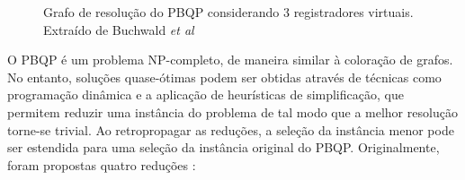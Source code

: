 \documentclass[
	12pt,				%
	openright,			%
	oneside,			%
	a4paper,			%
	tccpreliminar,			%
	]{ABNT-DC-UEL}
\begin{document}
\begin{figure}
    \centering
    
    \caption{Grafo de resolução do PBQP considerando 3 registradores virtuais. Extraído de Buchwald \textit{et al} \cite{buchwald:11}}
    \label{fig:9}
\end{figure}

O PBQP é um problema NP-completo, de maneira similar à coloração de grafos. No entanto, soluções quase-ótimas podem ser obtidas através de técnicas como programação dinâmica e a aplicação de heurísticas de simplificação, que permitem reduzir uma instância do problema de tal modo que a melhor resolução torne-se trivial. Ao retropropagar as reduções, a seleção da instância menor pode ser estendida para uma seleção da instância original do PBQP. Originalmente, foram propostas quatro reduções \cite{buchwald:10, eckstein:03}:
\end{document}

